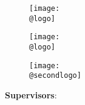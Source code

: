 

\begin{titlepage}
    \begin{center}
      \makeatletter 
        \begin{figure}[!htb]
          \centering
          
          \ifx\@secondlogo\none
            \begin{minipage}{0.42\textwidth}
            \centering       
            \texttt{[image: \\@logo]}
            \end{minipage}
          \else
            \begin{minipage}{0.42\textwidth}
            \centering       
            \texttt{[image: \\@logo]}
            \end{minipage}
            \hspace{1cm}
            \begin{minipage}{0.42\textwidth}
            \centering       
            \texttt{[image: \\@secondlogo]}
            \end{minipage}
          \fi

        \end{figure}
      \makeatother
      \vspace*{0.25cm}

        \maketitle

        \vspace{2cm}
        \large 
        \textbf{Supervisors}:\\
        \makeatletter
        \textbf{\@keywords}
        \makeatother
        

\end{center}
\end{titlepage}
